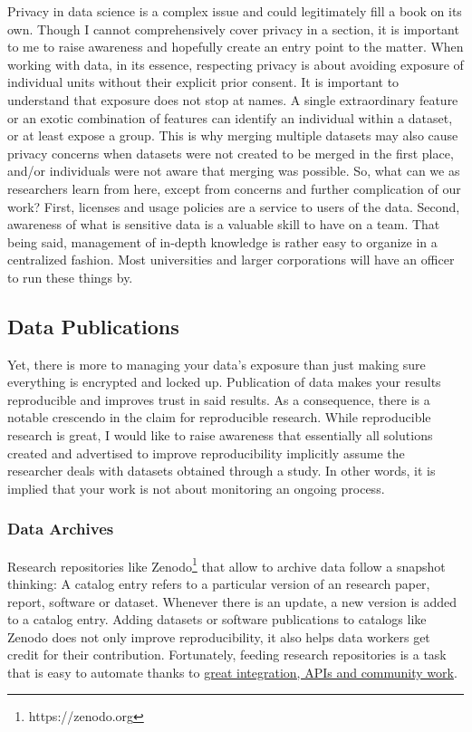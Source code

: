 \documentclass[
  12pt,
  letterpaper,
]{krantz}
\begin{document}
Privacy in data science is a complex issue and could legitimately fill a
book on its own. Though I cannot comprehensively cover privacy in a
section, it is important to me to raise awareness and hopefully create
an entry point to the matter. When working with data, in its essence,
respecting privacy is about avoiding exposure of individual units
without their explicit prior consent. It is important to understand that
exposure does not stop at names. A single extraordinary feature or an
exotic combination of features can identify an individual within a
dataset, or at least expose a group. This is why merging multiple
datasets may also cause privacy concerns when datasets were not created
to be merged in the first place, and/or individuals were not aware that
merging was possible. So, what can we as researchers learn from here,
except from concerns and further complication of our work? First,
licenses and usage policies are a service to users of the data. Second,
awareness of what is sensitive data is a valuable skill to have on a
team. That being said, management of in-depth knowledge is rather easy
to organize in a centralized fashion. Most universities and larger
corporations will have an officer to run these things by.

\hypertarget{data-publications}{%
\subsection{Data Publications}\label{data-publications}}

Yet, there is more to managing your data's exposure than just making
sure everything is encrypted and locked up. Publication of data makes
your results reproducible and improves trust in said results. As a
consequence, there is a notable crescendo in the claim for reproducible
research. While reproducible research is great, I would like to raise
awareness that essentially all solutions created and advertised to
improve reproducibility implicitly assume the researcher deals with
datasets obtained through a study. In other words, it is implied that
your work is not about monitoring an ongoing process.

\hypertarget{data-archives}{%
\subsubsection*{Data Archives}\label{data-archives}}

Research repositories like Zenodo\footnote{https://zenodo.org}
that allow to archive data follow a snapshot thinking: A catalog entry
refers to a particular version of an research paper, report, software or
dataset. Whenever there is an update, a new version is added to a
catalog entry. Adding datasets or software publications to catalogs like
Zenodo does not only improve reproducibility, it also helps data workers
get credit for their contribution. Fortunately, feeding research
repositories is a task that is easy to automate thanks to
\protect\hyperlink{datapub}{great integration, APIs and community work}.
\end{document}
